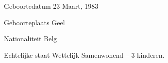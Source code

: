 


\begin{cvskills}


\cvskill
{Geboortedatum} %
{23 Maart, 1983} %


\cvskill
{Geboorteplaats} %
{Geel} %


\cvskill
{Nationaliteit} %
{Belg} %


\cvskill
{Echtelĳke staat} %
{Wettelijk Samenwonend – 3 kinderen.} %

\end{cvskills}
